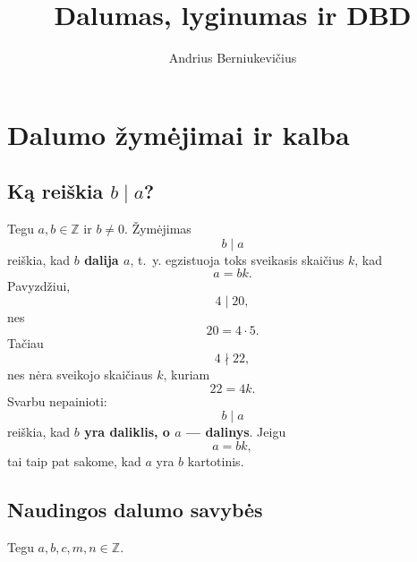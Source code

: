 \documentclass[11pt,a4paper]{scrartcl}
\title{Dalumas, lyginumas ir DBD}
\author{Andrius Berniukevičius}
\begin{document}
\maketitle

\section{Dalumo žymėjimai ir kalba}

\subsection{Ką reiškia $b\mid a$?}

Tegu $a,b\in\mathbb Z$ ir $b\neq 0$. Žymėjimas
\[
b\mid a
\]
reiškia, kad \textbf{$b$ dalija $a$}, t.~y. egzistuoja toks sveikasis skaičius
$k$, kad
\[
a=bk.
\]
Pavyzdžiui,
\[
4\mid 20,
\]
nes
\[
20=4\cdot 5.
\]
Tačiau
\[
4\nmid 22,
\]
nes nėra sveikojo skaičiaus $k$, kuriam
\[
22=4k.
\]
Svarbu nepainioti:
\[
b\mid a
\]
reiškia, kad \textbf{$b$ yra daliklis, o $a$ --- dalinys}. 
Jeigu
\[
a=bk,
\]
tai taip pat sakome, kad $a$ yra $b$ kartotinis.

\subsection{Naudingos dalumo savybės}

Tegu $a,b,c,m,n\in\mathbb Z$.
\end{document}
